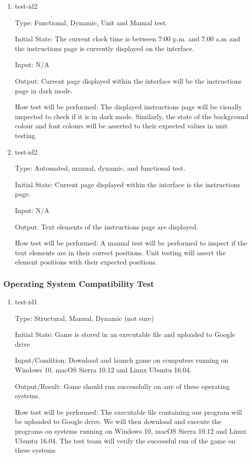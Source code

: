 \documentclass[12pt, titlepage]{article}
\begin{document}
\begin{enumerate}
\item{test-id2\\}

Type: Functional, Dynamic, Unit and Manual test.
					
Initial State:  The current clock time is between 7:00 p.m. and 7:00 a.m and the instructions page is currently displayed on the interface.
					
Input: N/A
					
Output: Current page displayed within the interface will be the instructions page in dark mode.
					
How test will be performed: The displayed instructions page will be visually inspected to check if it is in dark mode. Similarly, the state of the background colour and font colours will be asserted to their expected values in unit testing. 



\item{test-id2\\}

Type: Automated, manual, dynamic, and functional test.
					
Initial State: Current page displayed within the interface is the instructions page.
					
Input: N/A
					
Output: Text elements of the instructions page are displayed.
					
How test will be performed: A manual test will be performed to inspect if the text elements are in their correct positions. Unit testing will assert the element positions with their expected positions. 

\end{enumerate}

\subsubsection{Operating System Compatibility Test}

\begin{enumerate}

\item{test-id1\\}


Type: Structural, Manual, Dynamic (not sure)
					
Initial State: Game is stored in an executable file and uploaded to Google drive
					
Input/Condition: Download and launch game on computers running on  Windows 10, macOS Sierra 10.12 and Linux Ubuntu 16.04.
					
Output/Result: Game should run successfully on any of these operating systems.
					
How test will be performed: The executable file containing our program will be uploaded to Google drive.
We will then download and execute the programs on systems running on Windows 10, macOS Sierra 10.12 and Linux Ubuntu 16.04. The test team will verify the successful run of the game on these systems
\end{enumerate}
\end{document}
